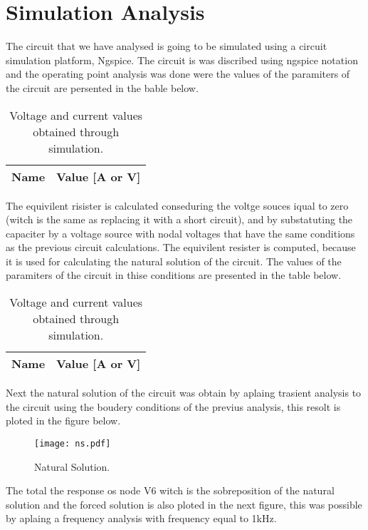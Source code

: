 \section{Simulation Analysis}
\label{sec:simulation}

The circuit that we have analysed is going to be simulated using a circuit simulation platform, Ngspice. The circuit is was discribed using ngspice notation and the operating point analysis was done were the values of the paramiters of the circuit are persented in the bable below.

\begin{table}[ht]
  \centering
  \begin{tabular}{|l|r|}
    \hline    
    {\bf Name} & {\bf Value [A or V]} \\ \hline
    
  \end{tabular}
  \caption{Voltage and current values obtained through simulation.}
  \label{tab:op}
\end{table}


The equivilent risister is calculated conseduring the voltge souces iqual to zero (witch is the same as replacing it with a short circuit), and by substatuting the capaciter by a voltage source with nodal voltages that have the same conditions as the previous circuit calculations. The equivilent resister is computed, because it is used for calculating the natural solution of the circuit. The values of the paramiters of the circuit in thise conditions are presented in the table below.

\begin{table}[ht]
  \centering
  \begin{tabular}{|l|r|}
    \hline    
    {\bf Name} & {\bf Value [A or V]} \\ \hline
    
  \end{tabular}
  \caption{Voltage and current values obtained through simulation.}
  \label{tab:op}
\end{table}

Next the natural solution of the circuit was obtain by aplaing trasient analysis to the circuit using the boudery conditions of the previus analysis, this resolt is ploted in the figure below.

\begin{figure}[ht] \centering
\texttt{[image: ns.pdf]}
\caption{Natural Solution.}
\label{Fig1: ns}
\end{figure}

The total the response os node V6 witch is the sobreposition of the natural solution and the forced solution is also ploted in the next figure, this was possible by aplaing a frequency analysis with frequency equal to 1kHz.

